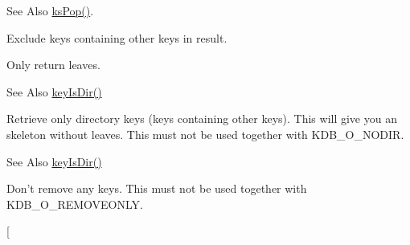 \begin{Desc}
\begin{description}
\begin{DoxySeeAlso}{See Also}
\hyperlink{group__keyset_gae42530b04defb772059de0600159cf69}{ks\-Pop()}. 
\end{DoxySeeAlso}
\item[{\em 
\hypertarget{group__kdb_gga98a3d6a4016c9dad9cbd1a99a9c2a45aa1a70738b2126badb8db7b012c8a1c610}{K\-D\-B\-\_\-\-O\-\_\-\-N\-O\-D\-I\-R}\label{group__kdb_gga98a3d6a4016c9dad9cbd1a99a9c2a45aa1a70738b2126badb8db7b012c8a1c610}
}]Exclude keys containing other keys in result.

Only return leaves.

\begin{DoxySeeAlso}{See Also}
\hyperlink{group__keytest_gac0a10c602d52a35f81347e8a32312017}{key\-Is\-Dir()} 
\end{DoxySeeAlso}
\item[{\em 
\hypertarget{group__kdb_gga98a3d6a4016c9dad9cbd1a99a9c2a45aa131e99d60253d0b887a1e5886f8aa96c}{K\-D\-B\-\_\-\-O\-\_\-\-D\-I\-R\-O\-N\-L\-Y}\label{group__kdb_gga98a3d6a4016c9dad9cbd1a99a9c2a45aa131e99d60253d0b887a1e5886f8aa96c}
}]Retrieve only directory keys (keys containing other keys). This will give you an skeleton without leaves. This must not be used together with K\-D\-B\-\_\-\-O\-\_\-\-N\-O\-D\-I\-R. \begin{DoxySeeAlso}{See Also}
\hyperlink{group__keytest_gac0a10c602d52a35f81347e8a32312017}{key\-Is\-Dir()} 
\end{DoxySeeAlso}
\item[{\em 
\hypertarget{group__kdb_gga98a3d6a4016c9dad9cbd1a99a9c2a45aa7649f575c2eb0adeaf2c9173ae16e0e6}{K\-D\-B\-\_\-\-O\-\_\-\-N\-O\-R\-E\-M\-O\-V\-E}\label{group__kdb_gga98a3d6a4016c9dad9cbd1a99a9c2a45aa7649f575c2eb0adeaf2c9173ae16e0e6}
}]Don't remove any keys. This must not be used together with K\-D\-B\-\_\-\-O\-\_\-\-R\-E\-M\-O\-V\-E\-O\-N\-L\-Y. \item[{\em 
}
\end{description}
\end{Desc}
